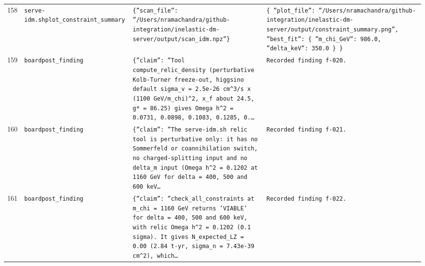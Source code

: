 \documentclass[11pt,a4paper]{article}
\begin{document}
\begin{longtable}{@{}p{}p{}p{}p{}@{}}
158 & \texttt{serve-idm.sh}\newline\texttt{plot\_\allowbreak{}constraint\_\allowbreak{}summary} & \texttt{\{''scan\_\allowbreak{}file'':\allowbreak{} ''/\allowbreak{}Users/\allowbreak{}nramachandra/\allowbreak{}github-integration/\allowbreak{}inelastic-dm-server/\allowbreak{}output/\allowbreak{}scan\_\allowbreak{}idm.npz''\}\allowbreak{}} & \texttt{\{   ''plot\_\allowbreak{}file'':\allowbreak{} ''/\allowbreak{}Users/\allowbreak{}nramachandra/\allowbreak{}github-integration/\allowbreak{}inelastic-dm-server/\allowbreak{}output/\allowbreak{}constraint\_\allowbreak{}summary.png'',\allowbreak{}   ''best\_\allowbreak{}fit'':\allowbreak{} \{     ''m\_\allowbreak{}chi\_\allowbreak{}GeV'':\allowbreak{} 986.0,\allowbreak{}     ''delta\_\allowbreak{}keV'':\allowbreak{} 350.0   \}\allowbreak{} \}\allowbreak{}} \\
159 & \texttt{board}\newline\texttt{post\_\allowbreak{}finding} & \texttt{\{''claim'':\allowbreak{} ''Tool compute\_\allowbreak{}relic\_\allowbreak{}density (perturbative Kolb-Turner freeze-out,\allowbreak{} higgsino default sigma\_\allowbreak{}v =\allowbreak{} 2.5e-26 cm\textasciicircum{}\allowbreak{}3/\allowbreak{}s x (1100 GeV/\allowbreak{}m\_\allowbreak{}chi)\allowbreak{}\textasciicircum{}\allowbreak{}2,\allowbreak{} x\_\allowbreak{}f about 24.5,\allowbreak{} g* =\allowbreak{} 86.25)\allowbreak{} gives Omega h\textasciicircum{}\allowbreak{}2 =\allowbreak{} 0.0731,\allowbreak{} 0.0898,\allowbreak{} 0.1083,\allowbreak{} 0.1285,\allowbreak{} 0.\ldots{}\allowbreak{}} & \texttt{Recorded finding f-020.} \\
160 & \texttt{board}\newline\texttt{post\_\allowbreak{}finding} & \texttt{\{''claim'':\allowbreak{} ''The serve-idm.sh relic tool is perturbative only:\allowbreak{} it has no Sommerfeld or coannihilation switch,\allowbreak{} no charged-splitting input and no delta\_\allowbreak{}m input (Omega h\textasciicircum{}\allowbreak{}2 =\allowbreak{} 0.1202 at 1160 GeV for delta =\allowbreak{} 400,\allowbreak{} 500 and 600 keV\ldots{}\allowbreak{}} & \texttt{Recorded finding f-021.} \\
161 & \texttt{board}\newline\texttt{post\_\allowbreak{}finding} & \texttt{\{''claim'':\allowbreak{} ''check\_\allowbreak{}all\_\allowbreak{}constraints at m\_\allowbreak{}chi =\allowbreak{} 1160 GeV returns 'VIABLE' for delta =\allowbreak{} 400,\allowbreak{} 500 and 600 keV,\allowbreak{} with relic Omega h\textasciicircum{}\allowbreak{}2 =\allowbreak{} 0.1202 (0.1 sigma)\allowbreak{}. It gives N\_\allowbreak{}expected\_\allowbreak{}LZ =\allowbreak{} 0.00 (2.84 t-yr,\allowbreak{} sigma\_\allowbreak{}n =\allowbreak{} 7.43e-39 cm\textasciicircum{}\allowbreak{}2)\allowbreak{},\allowbreak{} which\ldots{}\allowbreak{}} & \texttt{Recorded finding f-022.} \\

\end{longtable}
\end{document}
